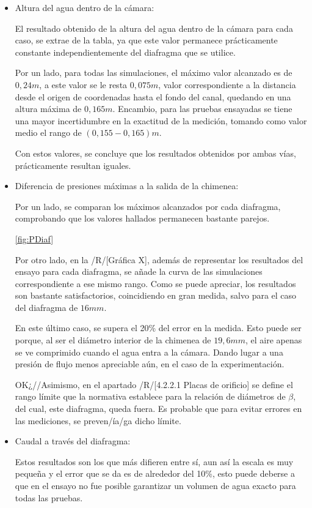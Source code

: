 \begin{itemize}
\item
  Altura del agua dentro de la cámara:

  El resultado obtenido de la altura del agua dentro de la cámara para
  cada caso, se extrae de la tabla, ya que este valor permanece
  prácticamente constante independientemente del diafragma que se
  utilice.

  Por un lado, para todas las simulaciones, el máximo valor alcanzado es
  de \(0,24m\), a este valor se le resta \(0,075m\), valor
  correspondiente a la distancia desde el origen de coordenadas hasta el
  fondo del canal, quedando en una altura máxima de \(0,165m\).
  Encambio, para las pruebas ensayadas se tiene una mayor incertidumbre
  en la exactitud de la medición, tomando como valor medio el rango de
  \((0,155-0,165)m\).

  Con estos valores, se concluye que los resultados obtenidos por ambas
  vías, prácticamente resultan iguales.
\item
  Diferencia de presiones máximas a la salida de la chimenea:

  Por un lado, se comparan los máximos alcanzados por cada diafragma,
  comprobando que los valores hallados permanecen bastante parejos.
  
  \autoref{fig:PDiaf}

  Por otro lado, en la /R/{[}Gráfica X{]}, además de representar los
  resultados del ensayo para cada diafragma, se añade la curva de las
  simulaciones correspondiente a ese mismo rango. Como se puede
  apreciar, los resultados son bastante satisfactorios, coincidiendo en
  gran medida, salvo para el caso del diafragma de \(16mm\).

  En este último caso, se supera el 20\% del error en la medida. Esto
  puede ser porque, al ser el diámetro interior de la chimenea de
  \(19,6mm\), el aire apenas se ve comprimido cuando el agua entra a la
  cámara. Dando lugar a una presión de flujo menos apreciable aún, en el
  caso de la experimentación.

  OK¿//Asimismo, en el apartado /R/{[}4.2.2.1 Placas de orificio{]} se
  define el rango límite que la normativa establece para la relación de
  diámetros de \(\beta\), del cual, este diafragma, queda fuera. Es
  probable que para evitar errores en las mediciones, se preven/ía/ga
  dicho límite.
\end{itemize}

\begin{itemize}
\item
  Caudal a través del diafragma:

  Estos resultados son los que más difieren entre sí, aun así la escala
  es muy pequeña y el error que se da es de alrededor del 10\%, esto
  puede deberse a que en el ensayo no fue posible garantizar un volumen
  de agua exacto para todas las pruebas.
\end{itemize}

